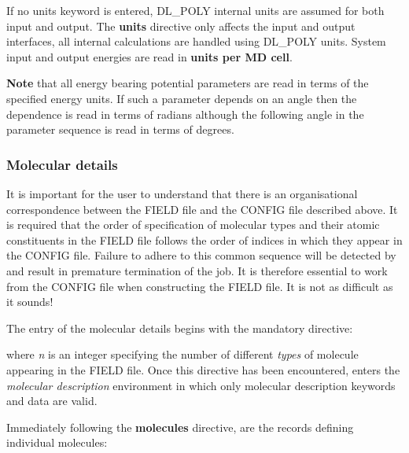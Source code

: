 \noindent If no units keyword is entered, DL\_POLY internal units
are assumed for both input and output.  The {\bf units} directive
only affects the input and output interfaces, all internal
calculations are handled using DL\_POLY units.  System input and
output energies are read in {\bf units per MD cell}.

{\bf Note} that all energy bearing potential parameters are read
in terms of the specified energy units.  If such a parameter
depends on an angle then the dependence is read in terms of
radians although the following angle in the parameter sequence
is read in terms of degrees.

\subsubsection*{Molecular details}

It is important for the user to understand that there is an
organisational correspondence between the FIELD file and the
CONFIG file described above.  It is required that the order of
specification of molecular types and their atomic constituents in
the FIELD file follows the order of indices in which they appear
in the CONFIG file.  Failure to adhere to this common sequence
will be detected by \D and result in premature termination of the
job. It is therefore essential to work from the CONFIG file when
constructing the FIELD file.  It is not as difficult as it sounds!

The entry of the molecular details begins with the mandatory
directive:


\noindent where {\em n} is an integer specifying the number of
different {\em types} of molecule appearing in the FIELD file.
Once this directive has been encountered, \D enters the {\em
molecular description} environment in which only molecular
description keywords and data are valid.

Immediately following the {\bf molecules} directive, are the records
defining individual molecules:

